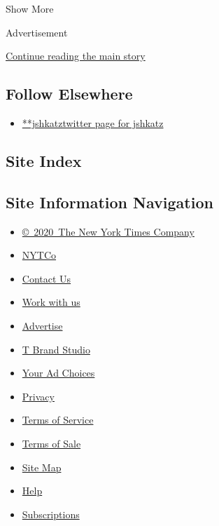 Show More

Advertisement

\protect\hyperlink{after-mid2}{Continue reading the main story}

\hypertarget{follow-elsewhere}{%
\subsection{Follow Elsewhere}\label{follow-elsewhere}}

\begin{itemize}
\tightlist
\item
  \href{https://twitter.com/jshkatz}{**jshkatztwitter page for jshkatz}
\end{itemize}

\hypertarget{site-index}{%
\subsection{Site Index}\label{site-index}}

\hypertarget{site-information-navigation}{%
\subsection{Site Information
Navigation}\label{site-information-navigation}}

\begin{itemize}
\tightlist
\item
  \href{https://help.nytimes3xbfgragh.onion/hc/en-us/articles/115014792127-Copyright-notice}{©~2020~The
  New York Times Company}
\end{itemize}

\begin{itemize}
\tightlist
\item
  \href{https://www.nytco.com/}{NYTCo}
\item
  \href{https://help.nytimes3xbfgragh.onion/hc/en-us/articles/115015385887-Contact-Us}{Contact
  Us}
\item
  \href{https://www.nytco.com/careers/}{Work with us}
\item
  \href{https://nytmediakit.com/}{Advertise}
\item
  \href{http://www.tbrandstudio.com/}{T Brand Studio}
\item
  \href{https://www.nytimes3xbfgragh.onion/privacy/cookie-policy\#how-do-i-manage-trackers}{Your
  Ad Choices}
\item
  \href{https://www.nytimes3xbfgragh.onion/privacy}{Privacy}
\item
  \href{https://help.nytimes3xbfgragh.onion/hc/en-us/articles/115014893428-Terms-of-service}{Terms
  of Service}
\item
  \href{https://help.nytimes3xbfgragh.onion/hc/en-us/articles/115014893968-Terms-of-sale}{Terms
  of Sale}
\item
  \href{https://spiderbites.nytimes3xbfgragh.onion}{Site Map}
\item
  \href{https://help.nytimes3xbfgragh.onion/hc/en-us}{Help}
\item
  \href{https://www.nytimes3xbfgragh.onion/subscription?campaignId=37WXW}{Subscriptions}
\end{itemize}
